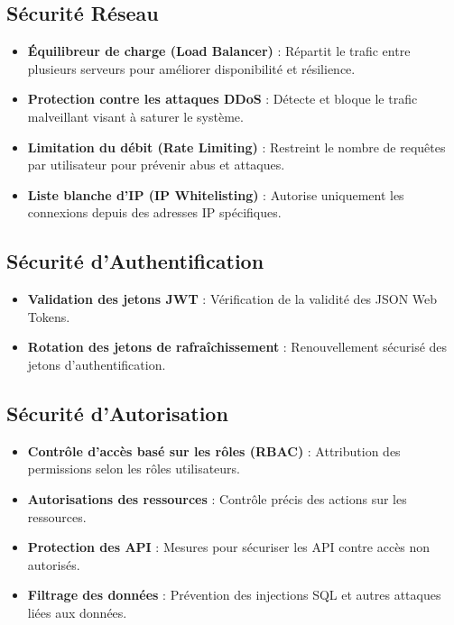 \documentclass{rapportPfe}
\begin{document}
\subsection*{Sécurité Réseau}
\begin{itemize}
  \item \textbf{Équilibreur de charge (Load Balancer)} : Répartit le trafic entre plusieurs serveurs pour améliorer disponibilité et résilience.
  \item \textbf{Protection contre les attaques DDoS} : Détecte et bloque le trafic malveillant visant à saturer le système.
  \item \textbf{Limitation du débit (Rate Limiting)} : Restreint le nombre de requêtes par utilisateur pour prévenir abus et attaques.
  \item \textbf{Liste blanche d'IP (IP Whitelisting)} : Autorise uniquement les connexions depuis des adresses IP spécifiques.
\end{itemize}

\subsection*{Sécurité d'Authentification}
\begin{itemize}
  \item \textbf{Validation des jetons JWT} : Vérification de la validité des JSON Web Tokens.
  \item \textbf{Rotation des jetons de rafraîchissement} : Renouvellement sécurisé des jetons d'authentification.
\end{itemize}

\subsection*{Sécurité d'Autorisation}
\begin{itemize}
  \item \textbf{Contrôle d'accès basé sur les rôles (RBAC)} : Attribution des permissions selon les rôles utilisateurs.
  \item \textbf{Autorisations des ressources} : Contrôle précis des actions sur les ressources.
  \item \textbf{Protection des API} : Mesures pour sécuriser les API contre accès non autorisés.
  \item \textbf{Filtrage des données} : Prévention des injections SQL et autres attaques liées aux données.
\end{itemize}
\end{document}
